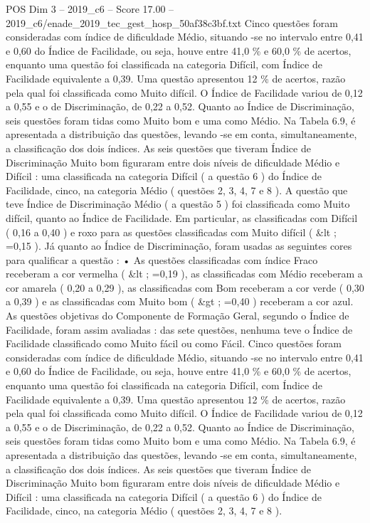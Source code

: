 \begin{textsample}{POS Dim 3 – 2019\_c6 – Score 17.00 – 2019\_c6/enade\_2019\_tec\_gest\_hosp\_50af38c3bf.txt}
Cinco questões foram consideradas com índice de dificuldade Médio, situando -se no intervalo entre 0,41 e 0,60 do Índice de Facilidade, ou seja, houve entre 41,0 \% e 60,0 \% de acertos, enquanto uma questão foi classificada na categoria Difícil, com Índice de Facilidade equivalente a 0,39.
Uma questão apresentou 12 \% de acertos, razão pela qual foi classificada como Muito difícil.
O Índice de Facilidade variou de 0,12 a 0,55 e o de Discriminação, de 0,22 a 0,52.
Quanto ao Índice de Discriminação, seis questões foram tidas como Muito bom e uma como Médio.
Na Tabela 6.9, é apresentada a distribuição das questões, levando -se em conta, simultaneamente, a classificação dos dois índices.
As seis questões que tiveram Índice de Discriminação Muito bom figuraram entre dois níveis de dificuldade Médio e Difícil : uma classificada na categoria Difícil ( a questão 6 ) do Índice de Facilidade, cinco, na categoria Médio ( questões 2, 3, 4, 7 e 8 ).
A questão que teve Índice de Discriminação Médio ( a questão 5 ) foi classificada como Muito difícil, quanto ao Índice de Facilidade.
Em particular, as classificadas com Difícil ( 0,16 a 0,40 ) e roxo para as questões classificadas com Muito difícil ( \&lt ; =0,15 ).
Já quanto ao Índice de Discriminação, foram usadas as seguintes cores para qualificar a questão : • As questões classificadas com índice Fraco receberam a cor vermelha ( \&lt ; =0,19 ), as classificadas com Médio receberam a cor amarela ( 0,20 a 0,29 ), as classificadas com Bom receberam a cor verde ( 0,30 a 0,39 ) e as classificadas com Muito bom ( \&gt ; =0,40 ) receberam a cor azul.
As questões objetivas do Componente de Formação Geral, segundo o Índice de Facilidade, foram assim avaliadas : das sete questões, nenhuma teve o Índice de Facilidade classificado como Muito fácil ou como Fácil.
Cinco questões foram consideradas com índice de dificuldade Médio, situando -se no intervalo entre 0,41 e 0,60 do Índice de Facilidade, ou seja, houve entre 41,0 \% e 60,0 \% de acertos, enquanto uma questão foi classificada na categoria Difícil, com Índice de Facilidade equivalente a 0,39.
Uma questão apresentou 12 \% de acertos, razão pela qual foi classificada como Muito difícil.
O Índice de Facilidade variou de 0,12 a 0,55 e o de Discriminação, de 0,22 a 0,52.
Quanto ao Índice de Discriminação, seis questões foram tidas como Muito bom e uma como Médio.
Na Tabela 6.9, é apresentada a distribuição das questões, levando -se em conta, simultaneamente, a classificação dos dois índices.
As seis questões que tiveram Índice de Discriminação Muito bom figuraram entre dois níveis de dificuldade Médio e Difícil : uma classificada na categoria Difícil ( a questão 6 ) do Índice de Facilidade, cinco, na categoria Médio ( questões 2, 3, 4, 7 e 8 ).

\end{textsample}
